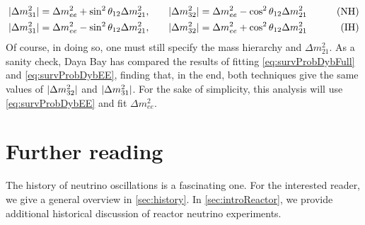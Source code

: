 \documentclass[../thesis.tex]{subfiles}
\begin{document}
\begin{align*}
  \lvert \Delta m^2_{31}\rvert = \Delta m^2_{ee} + \sin^2 \theta_{12} \Delta m^2_{21}, \qquad
  & \lvert \Delta m^2_{32}\rvert = \Delta m^2_{ee} - \cos^2 \theta_{12} \Delta m^2_{21} \qquad
  & \text{(NH)}\\
  \lvert \Delta m^2_{31}\rvert = \Delta m^2_{ee} - \sin^2 \theta_{12} \Delta m^2_{21}, \qquad
  & \lvert \Delta m^2_{32}\rvert = \Delta m^2_{ee} + \cos^2 \theta_{12} \Delta m^2_{21} \qquad
  & \text{(IH)}
\end{align*}
Of course, in doing so, one must still specify the mass hierarchy and \(\Delta m^2_{21}.\) As a sanity check, Daya Bay has compared the results of fitting \autoref{eq:survProbDybFull} and \autoref{eq:survProbDybEE}, finding that, in the end, both techniques give the same values of \(\lvert \Delta m^2_{32}\rvert\) and \(\lvert \Delta m^2_{31}\rvert\). For the sake of simplicity, this analysis will use \autoref{eq:survProbDybEE} and fit \(\Delta m^2_{ee}\).

\section{Further reading}
\label{sec:introFurther}

The history of neutrino oscillations is a fascinating one. For the interested reader, we give a general overview in \autoref{sec:history}. In \autoref{sec:introReactor}, we provide additional historical discussion of reactor neutrino experiments.

\subfilebackmatter
\end{document}
